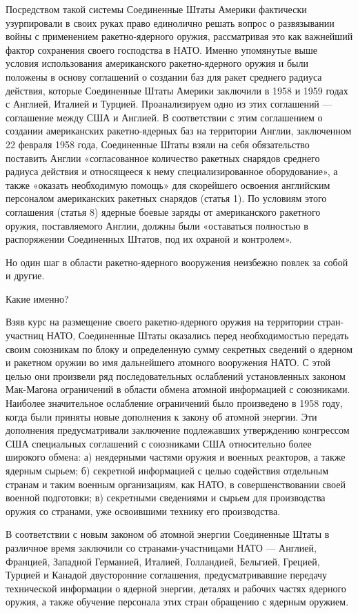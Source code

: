 \documentclass[12pt, a4paper, openany]{book}
\begin{document}
Посредством такой системы Соединенные Штаты Америки фактически узурпировали в своих руках право единолично решать вопрос о развязывании войны с применением ракетно-ядерного оружия, рассматривая это как важнейший фактор сохранения своего господства в НАТО. Именно упомянутые выше условия использования американского ракетно-ядерного оружия и были положены в основу соглашений о создании баз для ракет среднего радиуса действия, которые Соединенные Штаты Америки заключили в 1958 и 1959 годах с Англией, Италией и Турцией. Проанализируем одно из этих соглашений — соглашение между США и Англией. В соответствии с этим соглашением о создании американских ракетно-ядерных баз на территории Англии, заключенном 22 февраля 1958 года, Соединенные Штаты взяли на себя обязательство поставить Англии «согласованное количество ракетных снарядов среднего радиуса действия и относящееся к нему специализированное оборудование», а также «оказать необходимую помощь» для скорейшего освоения английским персоналом американских ракетных снарядов (статья 1). По условиям этого соглашения (статья 8) ядерные боевые заряды от американского ракетного оружия, поставляемого Англии, должны были «оставаться полностью в распоряжении Соединенных Штатов, под их охраной и контролем».
	
Но один шаг в области ракетно-ядерного вооружения неизбежно повлек за собой и другие.
	
Какие именно?
	
Взяв курс на размещение своего ракетно-ядерного оружия на территории стран-участниц НАТО, Соединенные Штаты оказались перед необходимостью передать своим союзникам по блоку и определенную сумму секретных сведений о ядерном и ракетном оружии во имя дальнейшего атомного вооружения НАТО. С этой целью они произвели ряд последовательных ослаблений установленных законом Мак-Магона ограничений в области обмена атомной информацией с союзниками. Наиболее значительное ослабление ограничений было произведено в 1958 году, когда были приняты новые дополнения к закону об атомной энергии. Эти дополнения предусматривали заключение подлежавших утверждению конгрессом США специальных соглашений с союзниками США относительно более широкого обмена: а) неядерными частями оружия и военных реакторов, а также ядерным сырьем; б) секретной информацией с целью содействия отдельным странам и таким военным организациям, как НАТО, в совершенствовании своей военной подготовки; в) секретными сведениями и сырьем для производства оружия со странами, уже освоившими технику его производства.
	
В соответствии с новым законом об атомной энергии Соединенные Штаты в различное время заключили со странами-участницами НАТО — Англией, Францией, Западной Германией, Италией, Голландией, Бельгией, Грецией, Турцией и Канадой двусторонние соглашения, предусматривавшие передачу технической информации о ядерной энергии, деталях и рабочих частях ядерного оружия, а также обучение персонала этих стран обращению с ядерным оружием.
	
\end{document}
